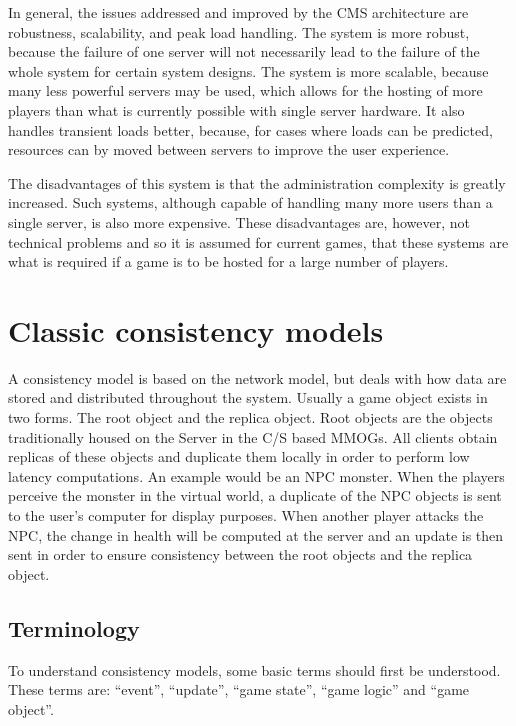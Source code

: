 \documentclass[10pt,a4paper,journal,cspaper,compsoc]{IEEEtran}
\begin{document}
In general, the issues addressed and improved by the \ac{CMS} architecture are robustness, scalability, and peak load handling. The system is more
robust, because the failure of one server will not necessarily lead to the failure of the whole system for certain system designs. The system is more
scalable, because many less powerful servers may be used, which allows for the hosting of more players than what is currently possible with single
server hardware. It also handles transient loads better, because, for cases where loads can be predicted, resources can by moved between servers to
improve the user experience.

The disadvantages of this system is that the administration complexity is greatly increased. Such systems, although capable of handling many more
users than a single server, is also more expensive. These disadvantages are, however, not technical problems and so it is assumed for current games,
that these systems are what is required if a game is to be hosted for a large number of players.

\section{Classic consistency models}
\label{classic_models}

A consistency model is based on the network model, but deals with how data are stored and distributed throughout the system. Usually a game object
exists in two forms. The root object and the replica object. Root objects are the objects traditionally housed on the Server in the C/S based MMOGs.
All clients obtain replicas of these objects and duplicate them locally in order to perform low latency computations. An example would be an NPC
monster. When the players perceive the monster in the virtual world, a duplicate of the NPC objects is sent to the user's computer for display
purposes. When another player attacks the NPC, the change in health will be computed at the server and an update is then sent in order to ensure
consistency between the root objects and the replica object.

\subsection{Terminology}

To understand consistency models, some basic terms should first be understood. These terms are: ``event'', ``update'', ``game state'', ``game logic''
and ``game object''.
\end{document}
